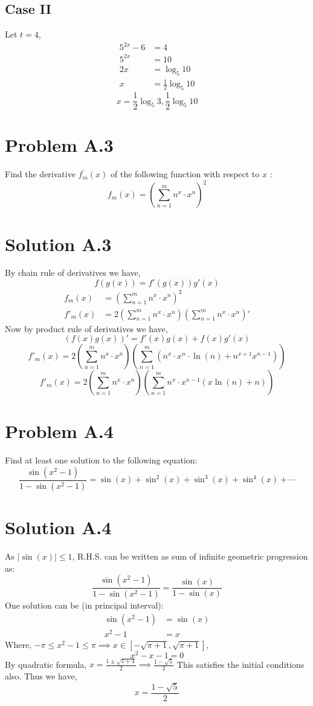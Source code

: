\documentclass{article}
\begin{document}
\subsection*{Case II}
Let $t=4$,
\begin{align*}
    5^{2x}-6&=4 \\
    5^{2x}&=10 \\
    2x&=\log_5{10} \\
    x&=\frac{1}{2}\log_5{10}
\end{align*}
$$\boxed{x=\frac{1}{2}\log_5{3}, \frac{1}{2}\log_5{10}}$$

\newpage
\section*{Problem A.3}
Find the derivative $f_{m}^{\prime}(x)$ of the following function with respect to $x$ :
$$
f_{m}(x)=\left(\sum_{n=1}^{m} n^{x} \cdot x^{n}\right)^{2}
$$
\section*{Solution A.3}
By chain rule of derivatives we have,
$$f(g(x))=f'(g(x))g'(x)$$
\begin{align*}
    f_m(x)&=\left(\sum\limits_{n=1}^{m}n^x\cdot x^n\right)^2 \\
    f'_m(x)&=2\left(\sum\limits_{n=1}^{m}n^x\cdot x^n\right)\left(\sum\limits_{n=1}^{m}n^x\cdot x^n\right)'
\end{align*}
Now by product rule of derivatives we have,
\[\left(f(x)g(x)\right)'=f'(x)g(x)+f(x)g'(x)\]
\[f'_m(x)=2\left(\sum_{n=1}^{m}n^x\cdot x^n\right)\left(\sum_{n=1}^{m} \left(n^x \cdot x^n \cdot \ln(n) + n^{x+1}x^{n-1}\right)\right)\]
\[\boxed{f'_m(x)=2\left(\sum_{n=1}^{m}n^x\cdot x^n\right)\left(\sum_{n=1}^{m}n^x \cdot x^{n-1} (x \ln(n)+n)\right)}\]

\newpage
\section*{Problem A.4}
Find at least one solution to the following equation:
$$
\frac{\sin \left(x^{2}-1\right)}{1-\sin \left(x^{2}-1\right)}=\sin (x)+\sin ^{2}(x)+\sin ^{3}(x)+\sin ^{4}(x)+\cdots
$$
\section*{Solution A.4}
As $|\sin(x)| \leq 1$, R.H.S. can be written as sum of infinite geometric progression as:
\[\frac{\sin(x^{2}-1)}{1-\sin(x^{2}-1)}=\frac{\sin(x)}{1-\sin(x)}\]
One solution can be (in principal interval):
\begin{align*}
    \sin(x^{2}-1)&=\sin(x) \\
    x^{2}-1&=x
\end{align*}
Where, $-\pi \leq x^{2}-1 \leq \pi \implies x \in [-\sqrt{\pi+1}, \sqrt{\pi+1}]$,
\[x^2-x-1=0\]
By quadratic formula,
$x=\frac{1\pm \sqrt{1+4}}{2} \implies \frac{1-\sqrt{5}}{2}$
This satisfies the initial conditions also. Thus we have,
\[\boxed{x=\frac{1-\sqrt{5}}{2}}\]
\end{document}
